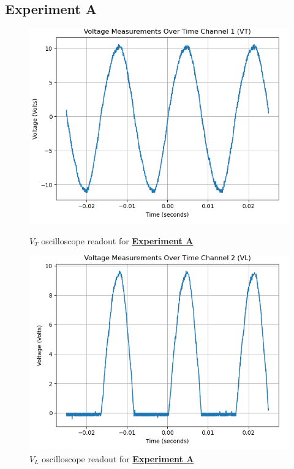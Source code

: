\documentclass[
	letterpaper
	12pt
]{template}
\newcommand{\bref}[2]{\textbf{\hyperref[#1]{#2}}}
\begin{document}
\subsection{Experiment A}
\begin{figure}[H]\label{data::A}
	\centering
	\begin{minipage}[c]{0.45\textwidth}
		\centering
		\includegraphics[width=\textwidth]{figures/A/1--ch1.png}
		\caption{$V_T$ oscilloscope readout for \bref{exp::A}{Experiment A}}
	\end{minipage}
	\hfill
	\begin{minipage}[c]{0.45\textwidth}
		\centering
		\includegraphics[width=\textwidth]{figures/A/1--ch2.png}
		\caption{$V_L$ oscilloscope readout for \bref{exp::A}{Experiment A}}
	\end{minipage}
\end{figure}
\end{document}
